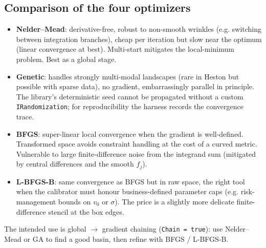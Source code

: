 \documentclass[11pt,a4paper]{article}
\begin{document}
\subsection{Comparison of the four optimizers}
\begin{itemize}
\item \textbf{Nelder--Mead}: derivative-free, robust to non-smooth wrinkles (e.g. switching between integration branches), cheap per iteration but slow near the optimum (linear convergence at best). Multi-start mitigates the local-minimum problem. Best as a global stage.
\item \textbf{Genetic}: handles strongly multi-modal landscapes (rare in Heston but possible with sparse data), no gradient, embarrassingly parallel in principle. The library's deterministic seed cannot be propagated without a custom \texttt{IRandomization}; for reproducibility the harness records the convergence trace.
\item \textbf{BFGS}: super-linear local convergence when the gradient is well-defined. Transformed space avoids constraint handling at the cost of a curved metric. Vulnerable to large finite-difference noise from the integrand sum (mitigated by central differences and the smooth $f_j$).
\item \textbf{L-BFGS-B}: same convergence as BFGS but in raw space, the right tool when the calibrator must honour business-defined parameter caps (e.g. risk-management bounds on $v_0$ or $\sigma$). The price is a slightly more delicate finite-difference stencil at the box edges.
\end{itemize}
The intended use is global $\to$ gradient chaining (\texttt{Chain = true}): use
Nelder--Mead or GA to find a good basin, then refine with BFGS / L-BFGS-B.
\end{document}
